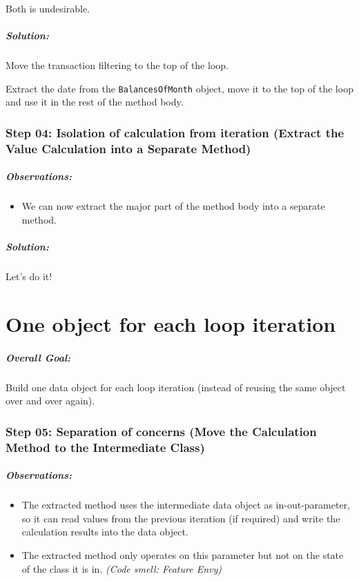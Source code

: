 \documentclass[a4paper,fleqn,titlepage,11pt]{article}
\begin{document}
Both is undesirable.

\subsubsection*{Solution:}

Move the transaction filtering to the top of the loop.

Extract the date from the \texttt{BalancesOfMonth} object, move it to the top of the loop and use it in the rest of the method body.


\section*{Step 04: Isolation of calculation from iteration (Extract the Value Calculation into a Separate Method)}

\subsubsection*{Observations:}
\begin{itemize}
\item We can now extract the major part of the method body into a separate method.
\end{itemize}

\subsubsection*{Solution:}

Let's do it!

\part{One object for each loop iteration}

\subsubsection*{Overall Goal:}

Build one data object for each loop iteration (instead of reusing the same object over and over again).


\section*{Step 05: Separation of concerns (Move the Calculation Method to the Intermediate Class)}

\subsubsection*{Observations:}
\begin{itemize}
\item The extracted method uses the intermediate data object as in-out-parameter, so it can read values from the previous iteration (if required) and write the calculation results into the data object.
\item The extracted method only operates on this parameter but not on the state of the class it is in. {\em (Code smell: Feature Envy)}
\end{itemize}
\end{document}
